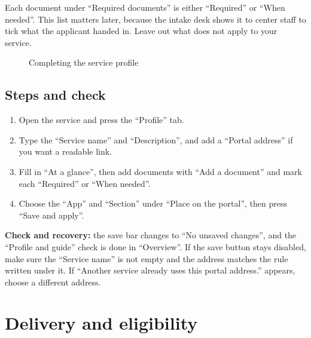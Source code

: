 Each document under “Required documents” is either “Required” or “When needed”. This list matters later, because the intake desk shows it to center staff to tick what the applicant handed in. Leave out what does not apply to your service.

\begin{figure}[H]
\centering
{}
\rclegend
\caption{Completing the service profile}
\label{fig:builder-services-profile-flow}
\end{figure}

\subsection{Steps and check}
\begin{enumerate}
\item Open the service and press the “Profile” tab.
\item Type the “Service name” and “Description”, and add a “Portal address” if you want a readable link.
\item Fill in “At a glance”, then add documents with “Add a document” and mark each “Required” or “When needed”.
\item Choose the “App” and “Section” under “Place on the portal”, then press “Save and apply”.
\end{enumerate}

\textbf{Check and recovery:} the save bar changes to “No unsaved changes”, and the “Profile and guide” check is done in “Overview”. If the save button stays disabled, make sure the “Service name” is not empty and the address matches the rule written under it. If “Another service already uses this portal address.” appears, choose a different address.

\clearpage
\section{Delivery and eligibility}
\label{sec:builder-feature-services-delivery}

